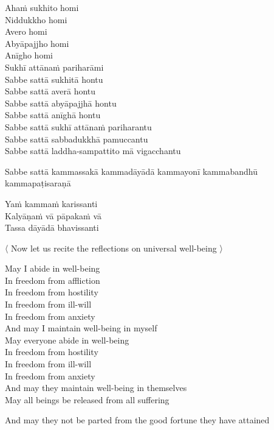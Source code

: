 Ahaṁ sukhito homi\\
Niddukkho homi\\
Avero homi\\
Abyāpajjho homi\\
Anīgho homi\\
Sukhī attānaṁ pariharāmi\\
Sabbe sattā sukhitā hontu\\
Sabbe sattā averā hontu\\
Sabbe sattā abyāpajjhā hontu\\
Sabbe sattā anīghā hontu\\
Sabbe sattā sukhī attānaṁ pariharantu\\
Sabbe sattā sabbadukkhā pamuccantu\\
Sabbe sattā laddha-sampattito mā vigacchantu

\bigskip

\begin{pali-hangtogether}
Sabbe sattā kammassakā kammadāyādā kammayonī kammabandhū kammapaṭisaraṇā\\
\end{pali-hangtogether}
Yaṁ kammaṁ karissanti\\
Kalyāṇaṁ vā pāpakaṁ vā\\
Tassa dāyādā bhavissanti

\clearpage

\begin{leader-english}
  〈 Now let us recite the reflections on universal well-being 〉
\end{leader-english}

\begin{english-verses}
  May I abide in well-being\\
  In freedom from affliction\\
  In freedom from hostility\\
  In freedom from ill-will\\
  In freedom from anxiety\\
  And may I maintain well-being in myself\\
  May everyone abide in well-being\\
  In freedom from hostility\\
  In freedom from ill-will\\
  In freedom from anxiety\\
  And may they maintain well-being in themselves\\
  May all beings be released from all suffering\\
\begin{english-hangtogether}
  And may they not be parted from the good fortune they have attained\hyperlink{endnote94-appendix}{\hypertarget{endnote94-body}{}}
\end{english-hangtogether}
\end{english-verses}

